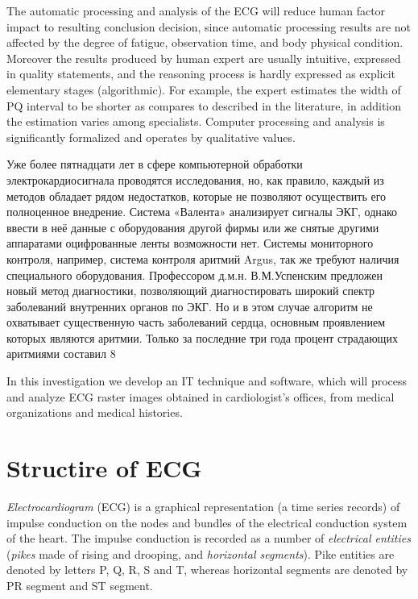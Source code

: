 \documentclass[runningheads]{AIIT}
\begin{document}
The automatic processing and analysis of the ECG will reduce human factor impact to resulting conclusion decision, since automatic processing results are not affected by the degree of fatigue, observation time, and body physical condition.  Moreover the results produced by human expert are usually intuitive, expressed in quality statements, and the reasoning process is hardly expressed as explicit elementary stages (algorithmic).  For example, the expert estimates the width of PQ interval to be shorter as compares to described in the literature, in addition the estimation varies among specialists.  Computer processing and analysis is significantly formalized and operates by qualitative values.




Уже более пятнадцати лет в сфере компьютерной обработки электрокардиосигнала проводятся исследования, но, как правило, каждый из методов обладает рядом недостатков, которые не позволяют осуществить его полноценное внедрение. Система «Валента» анализирует сигналы ЭКГ, однако ввести в неё данные с оборудования другой фирмы или же снятые другими аппаратами оцифрованные ленты возможности нет. Системы мониторного контроля, например, система контроля аритмий Argus, так же требуют наличия специального оборудования. Профессором д.м.н. В.М.Успенским предложен новый метод диагностики, позволяющий диагностировать широкий спектр заболеваний внутренних органов по ЭКГ.  Но и в этом случае алгоритм не охватывает существенную часть заболеваний сердца, основным проявлением которых являются аритмии. Только за последние три года процент страдающих аритмиями составил 8%

In this investigation we develop an IT technique and software, which will process and analyze ECG raster images obtained in cardiologist's offices, from medical organizations and medical histories.


\section{Structire of ECG}
\label{sec:structire-ecg}

\emph{Electrocardiogram} (ECG) is a graphical representation (a time series records) of impulse conduction on the nodes and bundles of the electrical conduction system of the heart.  The impulse conduction is recorded as a number of \emph{electrical entities} \cite{wikipedia} (\emph{pikes} made of rising and drooping, and \emph{horizontal segments}).  Pike entities are denoted by letters P, Q, R, S and T, whereas horizontal segments are denoted by PR segment and ST segment.
\end{document}
